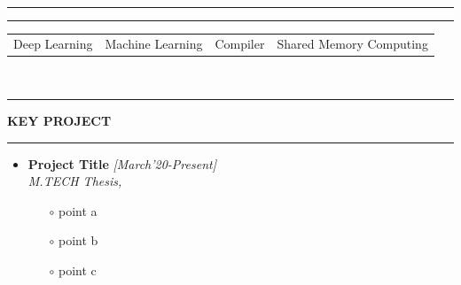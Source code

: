 \documentclass[10pt]{extarticle}
\begin{document}
\\
\noindent\rule[0ex]{\linewidth}{1.5pt}
\noindent\rule[1.5ex]{\linewidth}{0.5mm}
\begin{tabular}{c|c|c|c}
     Deep Learning & Machine Learning 
     & Compiler & Shared Memory Computing
\end{tabular}
\\
\noindent\rule[0ex]{\linewidth}{0.5mm}
{\textbf{\textsc{KEY PROJECT}}}
\noindent\rule[1.5ex]{\linewidth}{0.5mm}

\begin{itemize}
\item \textbf{Project Title} \hfill\emph{[March'20-Present]}\\
\emph{M.TECH Thesis,}
\begin{itemize}
    \item[$\circ$] point a
    \item[$\circ$] point b
    \item [$\circ$] point c
    \end{itemize}
    
\end{itemize}
\end{document}
